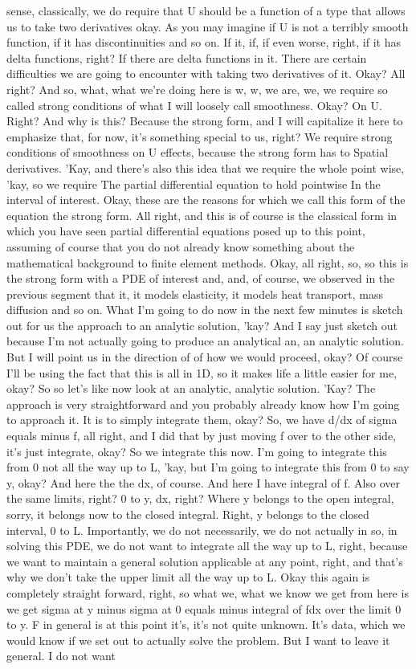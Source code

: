 \documentclass[10pt]{article}
\begin{document}
sense, classically, we do require that U should be a function of a type that allows us to take two derivatives okay. As you may imagine if U is not a terribly smooth function, if it has discontinuities and so on. If it, if, if even worse, right, if it has delta functions, right? If there are delta functions in it. There are certain difficulties we are going to encounter with taking two derivatives of it. Okay? All right? And so, what, what we're doing here is w, w, we are, we, we require so called strong conditions of what I will loosely call smoothness. Okay? On U. Right? And why is this? Because the strong form, and I will capitalize it here to emphasize that, for now, it's something special to us, right? We require strong conditions of smoothness on U effects, because the strong form has to Spatial derivatives. 'Kay, and there's also this idea that we require the whole point wise, 'kay, so we require The partial differential equation to hold pointwise In the interval of interest. Okay, these are the reasons for which we call this form of the equation the strong form. All right, and this is of course is the classical form in which you have seen partial differential equations posed up to this point, assuming of course that you do not already know something about the mathematical background to finite element methods. Okay, all right, so, so this is the strong form with a PDE of interest and, and, of course, we observed in the previous segment that it, it models elasticity, it models heat transport, mass diffusion and so on. What I'm going to do now in the next few minutes is sketch out for us the approach to an analytic solution, 'kay? And I say just sketch out because I'm not actually going to produce an analytical an, an analytic solution. But I will point us in the direction of of how we would proceed, okay? Of course I'll be using the fact that this is all in 1D, so it makes life a little easier for me, okay? So so let's like now look at an analytic, analytic solution. 'Kay? The approach is very straightforward and you probably already know how I'm going to approach it. It is to simply integrate them, okay? So, we have d/dx of sigma equals minus f, all right, and I did that by just moving f over to the other side, it's just integrate, okay? So we integrate this now. I'm going to integrate this from 0 not all the way up to L, 'kay, but I'm going to integrate this from 0 to say y, okay? And here the the dx, of course. And here I have integral of f. Also over the same limits, right? 0 to y, dx, right? Where y belongs to the open integral, sorry, it belongs now to the closed integral. Right, y belongs to the closed interval, 0 to L. Importantly, we do not necessarily, we do not actually in so, in solving this PDE, we do not want to integrate all the way up to L, right, because we want to maintain a general solution applicable at any point, right, and that's why we don't take the upper limit all the way up to L. Okay this again is completely straight forward, right, so what we, what we know we get from here is we get sigma at y minus sigma at 0 equals minus integral of fdx over the limit 0 to y. F in general is at this point it's, it's not quite unknown. It's data, which we would know if we set out to actually solve the problem. But I want to leave it general. I do not want 
\end{document}
